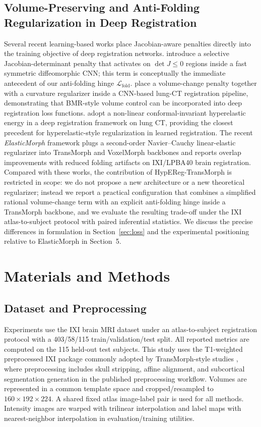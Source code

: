 \documentclass[jimaging,article,submit,pdftex,moreauthors]{Definitions/mdpi}
\begin{document}
\subsection{Volume-Preserving and Anti-Folding Regularization in Deep Registration}
Several recent learning-based works place Jacobian-aware penalties directly into the training objective of deep registration networks. \citet{mok2020fast} introduce a selective Jacobian-determinant penalty that activates on $\det J\le 0$ regions inside a fast symmetric diffeomorphic CNN; this term is conceptually the immediate antecedent of our anti-folding hinge $\mathcal{L}_{\mathrm{fold}}$. \citet{hering2021lung} place a volume-change penalty together with a curvature regularizer inside a CNN-based lung-CT registration pipeline, demonstrating that BMR-style volume control can be incorporated into deep registration loss functions. \citet{zou2023conformal} adopt a non-linear conformal-invariant hyperelastic energy in a deep registration framework on lung CT, providing the closest precedent for hyperelastic-style regularization in learned registration. The recent \emph{ElasticMorph} framework \cite{elasticmorph2025} plugs a second-order Navier--Cauchy linear-elastic regularizer into TransMorph and VoxelMorph backbones and reports overlap improvements with reduced folding artifacts on IXI/LPBA40 brain registration. Compared with these works, the contribution of HypEReg-TransMorph is restricted in scope: we do not propose a new architecture or a new theoretical regularizer; instead we report a practical configuration that combines a simplified rational volume-change term with an explicit anti-folding hinge inside a TransMorph backbone, and we evaluate the resulting trade-off under the IXI atlas-to-subject protocol with paired inferential statistics. We discuss the precise differences in formulation in Section~\ref{sec:loss} and the experimental positioning relative to ElasticMorph in Section~5.

\section{Materials and Methods}

\subsection{Dataset and Preprocessing}
Experiments use the IXI brain MRI dataset \cite{ixidataset} under an atlas-to-subject registration protocol with a 403/58/115 train/validation/test split. All reported metrics are computed on the 115 held-out test subjects. This study uses the T1-weighted preprocessed IXI package commonly adopted by TransMorph-style studies \cite{chen2022transmorph,kim2021cyclemorph}, where preprocessing includes skull stripping, affine alignment, and subcortical segmentation generation in the published preprocessing workflow. Volumes are represented in a common template space and cropped/resampled to \(160 \times 192 \times 224\). A shared fixed atlas image-label pair is used for all methods. Intensity images are warped with trilinear interpolation and label maps with nearest-neighbor interpolation in evaluation/training utilities.
\end{document}
